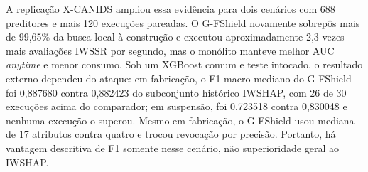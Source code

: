 A replicação X-CANIDS ampliou essa evidência para dois cenários com 688 preditores e mais 120 execuções pareadas. O G-FShield novamente sobrepôs mais de 99,65\% da busca local à construção e executou aproximadamente 2,3 vezes mais avaliações IWSSR por segundo, mas o monólito manteve melhor AUC \textit{anytime} e menor consumo. Sob um XGBoost comum e teste intocado, o resultado externo dependeu do ataque: em fabricação, o F1 macro mediano do G-FShield foi 0,887680 contra 0,882423 do subconjunto histórico IWSHAP, com 26 de 30 execuções acima do comparador; em suspensão, foi 0,723518 contra 0,830048 e nenhuma execução o superou. Mesmo em fabricação, o G-FShield usou mediana de 17 atributos contra quatro e trocou revocação por precisão. Portanto, há vantagem descritiva de F1 somente nesse cenário, não superioridade geral ao IWSHAP.
